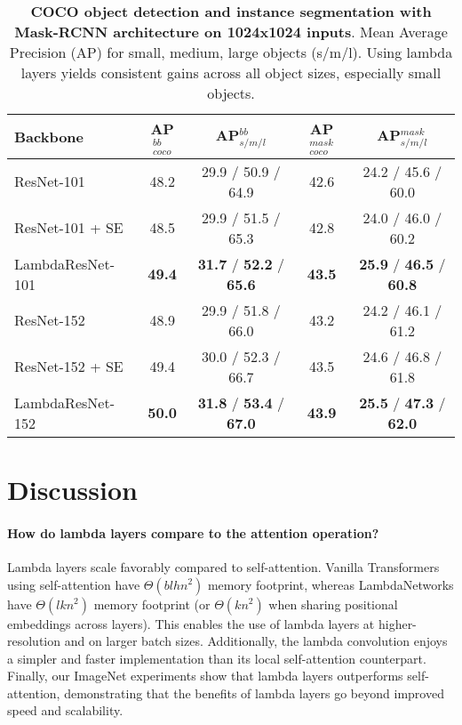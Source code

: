 \documentclass{article} \usepackage{iclr2021_conference,times}
\begin{document}
\begin{table}[ht!]
  \begin{center}
  \small
  \begin{tabular}{l|cc|cc}
    \toprule
    Backbone & AP$^{bb}_{coco}$ & AP$^{bb}_{s/m/l}$  & AP$^{mask}_{coco}$ & AP$^{mask}_{s/m/l}$ \\
    \midrule
    ResNet-101 & 48.2 & 29.9 \textcolor{codegray}{/ 50.9 / 64.9} & 42.6 & 24.2 \textcolor{codegray}{/ 45.6 / 60.0} \\
    ResNet-101 + SE & 48.5 & 29.9 \textcolor{codegray}{/ 51.5 / 65.3} & 42.8 & 24.0 \textcolor{codegray}{/ 46.0 / 60.2} \\
    LambdaResNet-101 & \textbf{49.4} & \textbf{31.7} 
    \textcolor{codegray}{/ \textbf{52.2} / \textbf{65.6}} & \textbf{43.5} & \textbf{25.9} \textcolor{codegray}{/ \textbf{46.5} / \textbf{60.8}} \\
    \midrule
    ResNet-152 & 48.9 & 29.9 \textcolor{codegray}{/ 51.8 / 66.0} & 43.2 & 24.2 \textcolor{codegray}{/ 46.1 / 61.2} \\
    ResNet-152 + SE & 49.4 & 30.0 \textcolor{codegray}{/ 52.3 / 66.7} & 43.5 & 24.6 \textcolor{codegray}{/ 46.8 / 61.8} \\
    LambdaResNet-152 & \textbf{50.0} & \textbf{31.8} \textcolor{codegray}{/ \textbf{53.4} / \textbf{67.0}} & \textbf{43.9} & \textbf{25.5} \textcolor{codegray}{/ \textbf{47.3} / \textbf{62.0}} \\
    \bottomrule
  \end{tabular}
  \caption{
  \textbf{COCO object detection and instance segmentation with Mask-RCNN architecture on 1024x1024 inputs}. 
  Mean Average Precision (AP) for small, medium, large objects (s/m/l). Using lambda layers yields consistent gains across all object sizes, especially small objects.
  }
  \label{tab:detection}
  \vspace{-0.3cm}
  \end{center}
\end{table}
 \section{Discussion}

\paragraph{How do lambda layers compare to the attention operation?} 
Lambda layers scale favorably compared to self-attention.
Vanilla Transformers using self-attention have $\Theta(blhn^2)$ memory footprint, whereas LambdaNetworks
have $\Theta(lkn^2)$ memory footprint (or $\Theta(kn^2)$ when sharing positional embeddings across layers).
This enables the use of lambda layers at higher-resolution and on larger batch sizes.
Additionally, the lambda convolution enjoys a simpler and faster implementation than its local self-attention counterpart.
Finally, our ImageNet experiments show that lambda layers outperforms self-attention, demonstrating that the benefits of lambda layers go beyond improved speed and scalability.
\end{document}
